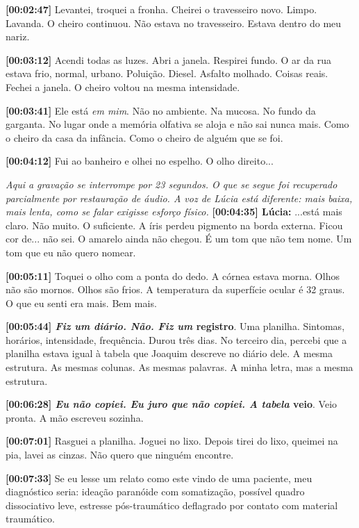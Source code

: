 \noindent \textbf{[00:02:47]} Levantei, troquei a fronha. Cheirei o travesseiro novo. Limpo. Lavanda. O cheiro continuou. Não estava no travesseiro. Estava dentro do meu nariz.

\noindent \textbf{[00:03:12]} Acendi todas as luzes. Abri a janela. Respirei fundo. O ar da rua estava frio, normal, urbano. Poluição. Diesel. Asfalto molhado. Coisas reais. Fechei a janela. O cheiro voltou na mesma intensidade.

\noindent \textbf{[00:03:41]} Ele está \textit{em mim}. Não no ambiente. Na mucosa. No fundo da garganta. No lugar onde a memória olfativa se aloja e não sai nunca mais. Como o cheiro da casa da infância. Como o cheiro de alguém que se foi.

\noindent \textbf{[00:04:12]} Fui ao banheiro e olhei no espelho. O olho direito...

\noindent \textit{Aqui a gravação se interrompe por 23 segundos. O que se segue foi recuperado parcialmente por restauração de áudio. A voz de Lúcia está diferente: mais baixa, mais lenta, como se falar exigisse esforço físico.}
\noindent \textbf{[00:04:35] Lúcia:} ...está mais claro. Não muito. O suficiente. A íris perdeu pigmento na borda externa. Ficou cor de... não sei. O amarelo ainda não chegou. É um tom que não tem nome. Um tom que eu não quero nomear.

\noindent \textbf{[00:05:11]} Toquei o olho com a ponta do dedo. A córnea estava morna. Olhos não são mornos. Olhos são frios. A temperatura da superfície ocular é 32 graus. O que eu senti era mais. Bem mais.

\noindent \textbf{[00:05:44]\textit{ Fiz um diário. Não. Fiz um }registro}. Uma planilha. Sintomas, horários, intensidade, frequência. Durou três dias. No terceiro dia, percebi que a planilha estava igual à tabela que Joaquim descreve no diário dele. A mesma estrutura. As mesmas colunas. As mesmas palavras. A minha letra, mas a mesma estrutura.

\noindent \textbf{[00:06:28]\textit{ Eu não copiei. Eu juro que não copiei. A tabela }veio}. Veio pronta. A mão escreveu sozinha.

\noindent \textbf{[00:07:01]} Rasguei a planilha. Joguei no lixo. Depois tirei do lixo, queimei na pia, lavei as cinzas. Não quero que ninguém encontre.

\noindent \textbf{[00:07:33]} Se eu lesse um relato como este vindo de uma paciente, meu diagnóstico seria: ideação paranóide com somatização, possível quadro dissociativo leve, estresse pós-traumático deflagrado por contato com material traumático.

